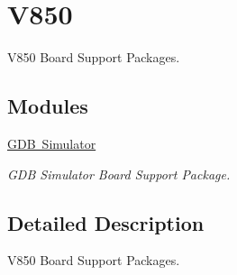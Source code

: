 \hypertarget{group__RTEMSBSPsV850}{}\section{V850}
\label{group__RTEMSBSPsV850}


V850 Board Support Packages.  


\subsection*{Modules}
\begin{DoxyCompactItemize}
\item 
\mbox{\hyperlink{group__RTEMSBSPsV850GDBSim}{G\+D\+B Simulator}}
\begin{DoxyCompactList}\small\item\em G\+DB Simulator Board Support Package. \end{DoxyCompactList}\end{DoxyCompactItemize}


\subsection{Detailed Description}
V850 Board Support Packages. 

